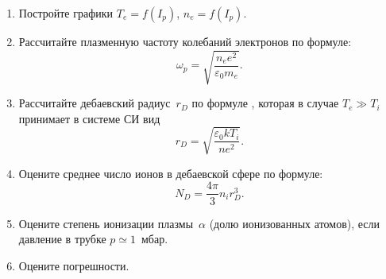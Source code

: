 \begin{lab:task}
\begin{enumerate}
\item Постройте графики $T_e=f(I_p)$, $n_e=f(I_p)$.

\item Рассчитайте плазменную частоту колебаний электронов по формуле:
\begin{equation}
	\omega_{p}=\sqrt{\frac{n_{e} e^2}{\varepsilon_{0} m_{e}} }.
\end{equation}

\item Рассчитайте дебаевский радиус~$r_{D}$ по формуле , которая в случае $T_{e}\gg T_{i}$ принимает в системе СИ вид
\begin{equation}
	r_{D}=\sqrt{\frac{\varepsilon_{0}kT_{i}}{ne^{2}}}.
\end{equation}

\item Оцените среднее число ионов в дебаевской сфере по формуле:
\begin{equation}
	N_{D}=\frac{4\pi}{3} n_{i}r_{D}^{3}.
\end{equation}

\item Оцените степень ионизации плазмы~$\alpha$ (долю ионизованных атомов), если давление в трубке $p\simeq 1$~мбар.

\item Оцените погрешности.

 \end{enumerate}

\end{lab:task}
